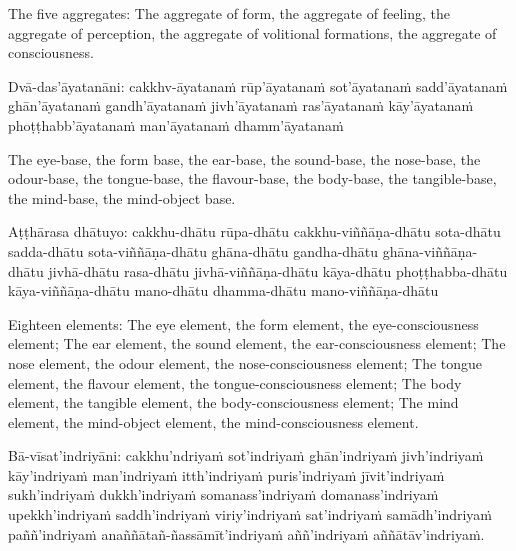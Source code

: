 \begin{english-hang-verses}
  The five aggregates: The aggregate of form, the aggregate of feeling, the aggregate of perception, the aggregate of volitional formations, the aggregate of consciousness.
\end{english-hang-verses}

\suttaRef{[MN 109]}

\begin{pali-hang-continued}
Dvā-das'āyatanāni: cakkhv-āyatanaṁ rūp'āyatanaṁ sot'āyatanaṁ sadd'āyatanaṁ ghān'āyatanaṁ gandh'āyatanaṁ jivh'āyatanaṁ ras'āyatanaṁ kāy'āyatanaṁ phoṭṭhabb'āyatanaṁ man'āyatanaṁ dhamm'āyatanaṁ
\end{pali-hang-continued}

\begin{english-hang-verses}
  The eye-base, the form base, the ear-base, the sound-base, the nose-base, the odour-base, the tongue-base, the flavour-base, the body-base, the tangible-base, the mind-base, the mind-object base.
\end{english-hang-verses}

\suttaRef{[MN 148]}

\begin{pali-hang-continued}
Aṭṭhārasa dhātuyo: cakkhu-dhātu rūpa-dhātu cakkhu-viññāṇa-dhātu sota-dhātu sadda-dhātu sota-viññāṇa-dhātu ghāna-dhātu gandha-dhātu ghāna-viññāṇa-dhātu jivhā-dhātu rasa-dhātu jivhā-viññāṇa-dhātu kāya-dhātu phoṭṭhabba-dhātu kāya-viññāṇa-dhātu mano-dhātu dhamma-dhātu mano-viññāṇa-dhātu
\end{pali-hang-continued}

\begin{english-hang-verses}
  Eighteen elements: The eye element, the form element, the eye-consciousness element; The ear element, the sound element, the ear-consciousness element; The nose element, the odour element, the nose-consciousness element; The tongue element, the flavour element, the tongue-consciousness element; The body element, the tangible element, the body-consciousness element; The mind element, the mind-object element, the mind-consciousness element.
\end{english-hang-verses}

\suttaRef{[MN 115]}

\begin{pali-hang-continued}
Bā-vīsat'indriyāni:\hyperlink{endnote1-appendix}{\hypertarget{endnote1-body}{}} cakkhu'ndriyaṁ sot'indriyaṁ ghān'indriyaṁ jivh'indriyaṁ kāy'indriyaṁ man'indriyaṁ itth'indriyaṁ puris'indriyaṁ jīvit'indriyaṁ sukh'indriyaṁ dukkh'indriyaṁ somanass'indriyaṁ domanass'indriyaṁ upekkh'indriyaṁ saddh'indriyaṁ viriy'indriyaṁ sat'indriyaṁ samādh'indriyaṁ paññ'indriyaṁ anaññātañ-ñassāmīt'indriyaṁ aññ'indriyaṁ aññātāv'indriyaṁ.
\end{pali-hang-continued}

